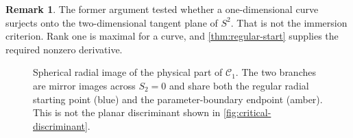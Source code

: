 \documentclass[11pt]{article}
\theoremstyle{definition}
\newtheorem{remark}[theorem]{Remark}
\newcommand{\Crat}{\mathcal C_1}
\begin{document}
\begin{remark}
The former argument tested whether a one-dimensional curve surjects onto the
two-dimensional tangent plane of $S^2$.  That is not the immersion
criterion.  Rank one is maximal for a curve, and
\cref{thm:regular-start} supplies the required nonzero derivative.
\end{remark}

\begin{figure}[p]
\centering
{}
\caption{Spherical radial image of the physical part of $\Crat$.  The two
branches are mirror images across $S_2=0$ and share both the regular radial
starting point (blue) and the parameter-boundary endpoint (amber).  This is
not the planar discriminant shown in \cref{fig:critical-discriminant}.}
\label{fig:stokes-3d}
\end{figure}
\end{document}
